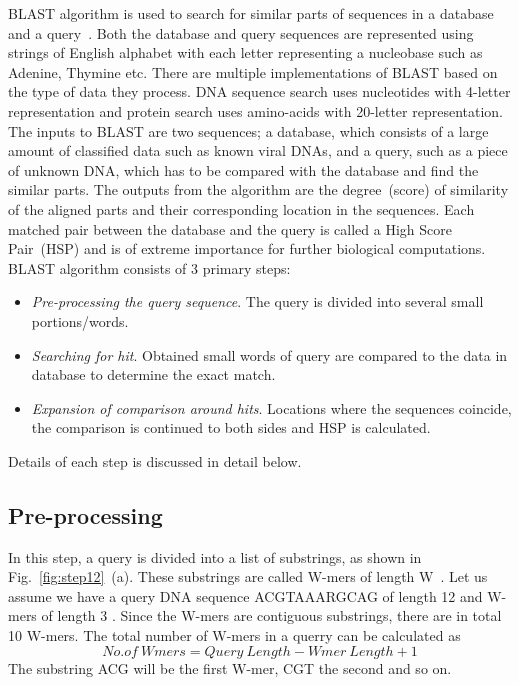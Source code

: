 BLAST algorithm is used to search for similar parts of sequences in a database and a query~\cite{Stephen1990}. 
Both the database and query sequences are represented using strings of English alphabet with each letter representing a nucleobase such as Adenine, Thymine etc.
There are multiple implementations of BLAST based on the type of data they process. 
DNA sequence search uses nucleotides with 4-letter  representation and protein search uses amino-acids with 20-letter representation. 
The inputs to BLAST are two sequences; a database, which consists of a large amount of classified data such as known viral DNAs, and a query, such as a piece of unknown DNA, which has to be compared with the database and find the similar parts. 
The outputs from the algorithm are the degree~(score) of similarity of the aligned parts and their corresponding location in the sequences. 
Each matched pair between the database and the query is called a High Score Pair~(HSP) and is of extreme importance for further biological computations. 
BLAST algorithm consists of 3 primary steps:
\begin{itemize}
\item{\textit{Pre-processing the query sequence}. The query is divided into several small portions/words.} 
\item{\textit{Searching for hit}. Obtained small words of query are compared to the data in database to determine the exact match.}
\item{\textit{Expansion of comparison around hits}. Locations where the sequences coincide, the comparison is continued to both sides and HSP is calculated.}
\end{itemize}
Details of each step is discussed in detail below.

\subsection{Pre-processing}
In this step, a query is divided into a list of substrings, as shown in Fig.~\ref{fig:step12}~(a). 
These substrings are called W-mers of length W~\cite{sotiriades2007design}. 
Let us assume we have a query DNA sequence ACGTAAARGCAG of length 12 and W-mers of length 3 \cite{sotiriades2007design}. 
Since the W-mers are contiguous substrings, there are in total 10 W-mers. 
The total number of W-mers in a querry can be calculated as 
\begin{equation}
\label{eq1}
No.of \ Wmers = Query \ Length - Wmer \ Length + 1 
\end{equation}
The substring ACG will be the first W-mer, CGT the second and so on. 



